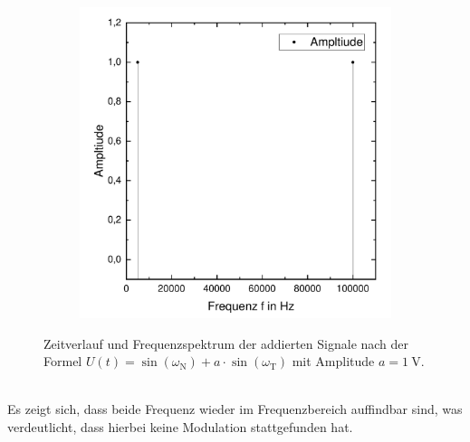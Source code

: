 \documentclass[a4paper,twoside,final]{article}
\begin{document}
\begin{figure}[htp]
\begin{subfigure}{0.45\textwidth}
        \includegraphics[width=\textwidth]{Bilder/Addition_Frequenzverlauf.pdf}
    \end{subfigure}
    \caption{Zeitverlauf und Frequenzspektrum der addierten Signale nach der Formel $U(t) = \sin(\omega_\text{N}) + a\cdot \sin(\omega_\text{T})$ mit Amplitude $a = \SI{1}{\volt}$.}
    \label{fig:Addition}
\end{figure}\\
Es zeigt sich, dass beide Frequenz wieder im Frequenzbereich auffindbar sind, was verdeutlicht, dass hierbei keine Modulation stattgefunden hat.
\end{document}
